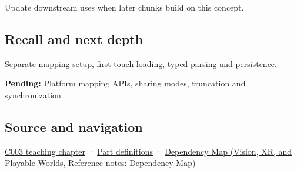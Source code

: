 \hypertarget{appendix-313ee7a0ba7b-used-by}{}

Update downstream uses when later chunks build on this concept.

\subsection{Recall and next depth}\label{appendix-313ee7a0ba7b-recall-and-next-depth}

\hypertarget{appendix-313ee7a0ba7b-recall-and-next-depth}{}

Separate mapping setup, first-touch loading, typed parsing and persistence.

\textbf{Pending:} Platform mapping APIs, sharing modes, truncation and synchronization.

\subsection{Source and navigation}\label{appendix-313ee7a0ba7b-source-and-navigation}

\hypertarget{appendix-313ee7a0ba7b-source-and-navigation}{}

\hyperref[01-foundations-i-ch002-where-the-bytes-live]{C003 teaching chapter} · \hyperref[appendix-fd090d982a15-m003---parts-41-60]{Part definitions} · \href{../07-Vision-XR-and-Playable-Worlds/main.pdf\#nameddest=appendix-4ad47bdd269a}{Dependency Map (Vision, XR, and Playable Worlds, Reference notes: Dependency Map)}
